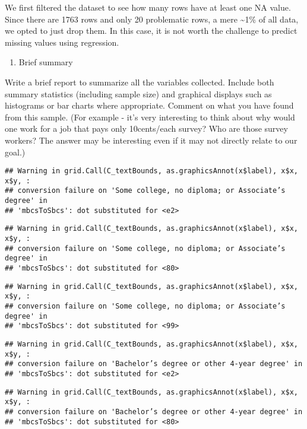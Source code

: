 \documentclass[
]{article}
\providecommand{\tightlist}{%
  \setlength{\itemsep}{0pt}\setlength{\parskip}{0pt}}
\begin{document}
We first filtered the dataset to see how many rows have at least one NA
value. Since there are 1763 rows and only 20 problematic rows, a mere
\textasciitilde1\% of all data, we opted to just drop them. In this
case, it is not worth the challenge to predict missing values using
regression.

\begin{enumerate}
\def\labelenumi{\arabic{enumi}.}
\setcounter{enumi}{2}
\tightlist
\item
  Brief summary
\end{enumerate}

Write a brief report to summarize all the variables collected. Include
both summary statistics (including sample size) and graphical displays
such as histograms or bar charts where appropriate. Comment on what you
have found from this sample. (For example - it's very interesting to
think about why would one work for a job that pays only 10cents/each
survey? Who are those survey workers? The answer may be interesting even
if it may not directly relate to our goal.)

\begin{verbatim}
## Warning in grid.Call(C_textBounds, as.graphicsAnnot(x$label), x$x, x$y, :
## conversion failure on 'Some college, no diploma; or Associate’s degree' in
## 'mbcsToSbcs': dot substituted for <e2>
\end{verbatim}

\begin{verbatim}
## Warning in grid.Call(C_textBounds, as.graphicsAnnot(x$label), x$x, x$y, :
## conversion failure on 'Some college, no diploma; or Associate’s degree' in
## 'mbcsToSbcs': dot substituted for <80>
\end{verbatim}

\begin{verbatim}
## Warning in grid.Call(C_textBounds, as.graphicsAnnot(x$label), x$x, x$y, :
## conversion failure on 'Some college, no diploma; or Associate’s degree' in
## 'mbcsToSbcs': dot substituted for <99>
\end{verbatim}

\begin{verbatim}
## Warning in grid.Call(C_textBounds, as.graphicsAnnot(x$label), x$x, x$y, :
## conversion failure on 'Bachelor’s degree or other 4-year degree' in
## 'mbcsToSbcs': dot substituted for <e2>
\end{verbatim}

\begin{verbatim}
## Warning in grid.Call(C_textBounds, as.graphicsAnnot(x$label), x$x, x$y, :
## conversion failure on 'Bachelor’s degree or other 4-year degree' in
## 'mbcsToSbcs': dot substituted for <80>
\end{verbatim}
\end{document}
